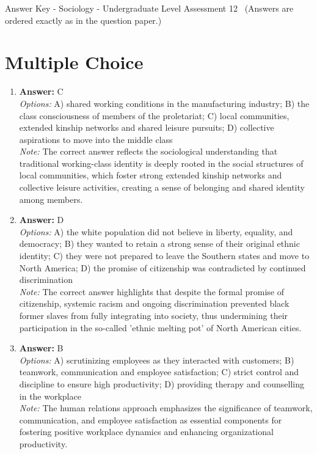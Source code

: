 \documentclass[12pt]{article}
\begin{document}
\begin{center}
Answer Key - Sociology - Undergraduate Level Assessment 12 \
\small (Answers are ordered exactly as in the question paper.)
\end{center}

\section*{Multiple Choice}
\begin{enumerate}[label=\arabic*.]
\item \textbf{Answer:} C
\\ \textit{Options:} A) shared working conditions in the manufacturing industry; B) the class consciousness of members of the proletariat; C) local communities, extended kinship networks and shared leisure pursuits; D) collective aspirations to move into the middle class
\\ \textit{Note:} The correct answer reflects the sociological understanding that traditional working-class identity is deeply rooted in the social structures of local communities, which foster strong extended kinship networks and collective leisure activities, creating a sense of belonging and shared identity among members.
\item \textbf{Answer:} D
\\ \textit{Options:} A) the white population did not believe in liberty, equality, and democracy; B) they wanted to retain a strong sense of their original ethnic identity; C) they were not prepared to leave the Southern states and move to North America; D) the promise of citizenship was contradicted by continued discrimination
\\ \textit{Note:} The correct answer highlights that despite the formal promise of citizenship, systemic racism and ongoing discrimination prevented black former slaves from fully integrating into society, thus undermining their participation in the so-called 'ethnic melting pot' of North American cities.
\item \textbf{Answer:} B
\\ \textit{Options:} A) scrutinizing employees as they interacted with customers; B) teamwork, communication and employee satisfaction; C) strict control and discipline to ensure high productivity; D) providing therapy and counselling in the workplace
\\ \textit{Note:} The human relations approach emphasizes the significance of teamwork, communication, and employee satisfaction as essential components for fostering positive workplace dynamics and enhancing organizational productivity.

\end{enumerate}
\end{document}
